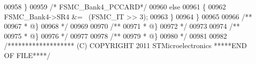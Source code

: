 \begin{DoxyCode}
00958   \}
00959   \textcolor{comment}{/* FSMC\_Bank4\_PCCARD*/}
00960   \textcolor{keywordflow}{else}
00961   \{
00962     FSMC_Bank4->SR4 &= ~(FSMC\_IT >> 3);
00963   \}
00964 \}
00965 
00966 \textcolor{comment}{/**}
00967 \textcolor{comment}{  * @\}}
00968 \textcolor{comment}{  */}
00969 
00970 \textcolor{comment}{/**}
00971 \textcolor{comment}{  * @\}}
00972 \textcolor{comment}{  */}
00973 
00974 \textcolor{comment}{/**}
00975 \textcolor{comment}{  * @\}}
00976 \textcolor{comment}{  */}
00977 
00978 \textcolor{comment}{/**}
00979 \textcolor{comment}{  * @\}}
00980 \textcolor{comment}{  */}
00981 
00982 \textcolor{comment}{/******************* (C) COPYRIGHT 2011 STMicroelectronics *****END OF FILE****/}
\end{DoxyCode}
